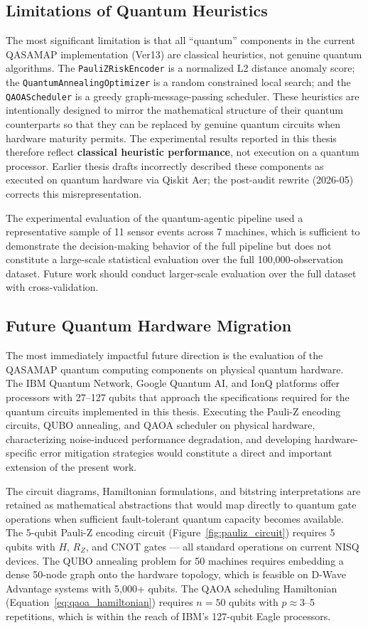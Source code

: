 \subsection{Limitations of Quantum Heuristics}

The most significant limitation is that all ``quantum'' components in the current QASAMAP implementation (Ver13) are classical heuristics, not genuine quantum algorithms. The \texttt{PauliZRiskEncoder} is a normalized L2 distance anomaly score; the \texttt{QuantumAnnealingOptimizer} is a random constrained local search; and the \texttt{QAOAScheduler} is a greedy graph-message-passing scheduler. These heuristics are intentionally designed to mirror the mathematical structure of their quantum counterparts so that they can be replaced by genuine quantum circuits when hardware maturity permits. The experimental results reported in this thesis therefore reflect \textbf{classical heuristic performance}, not execution on a quantum processor. Earlier thesis drafts incorrectly described these components as executed on quantum hardware via Qiskit Aer; the post-audit rewrite (2026-05) corrects this misrepresentation.

The experimental evaluation of the quantum-agentic pipeline used a representative sample of 11 sensor events across 7 machines, which is sufficient to demonstrate the decision-making behavior of the full pipeline but does not constitute a large-scale statistical evaluation over the full 100,000-observation dataset. Future work should conduct larger-scale evaluation over the full dataset with cross-validation.

\subsection{Future Quantum Hardware Migration}

The most immediately impactful future direction is the evaluation of the QASAMAP quantum computing components on physical quantum hardware. The IBM Quantum Network, Google Quantum AI, and IonQ platforms offer processors with 27--127 qubits that approach the specifications required for the quantum circuits implemented in this thesis. Executing the Pauli-Z encoding circuits, QUBO annealing, and QAOA scheduler on physical hardware, characterizing noise-induced performance degradation, and developing hardware-specific error mitigation strategies would constitute a direct and important extension of the present work.

The circuit diagrams, Hamiltonian formulations, and bitstring interpretations are retained as mathematical abstractions that would map directly to quantum gate operations when sufficient fault-tolerant quantum capacity becomes available. The 5-qubit Pauli-Z encoding circuit (Figure~\ref{fig:pauliz_circuit}) requires 5 qubits with $H$, $R_Z$, and CNOT gates --- all standard operations on current NISQ devices. The QUBO annealing problem for 50 machines requires embedding a dense 50-node graph onto the hardware topology, which is feasible on D-Wave Advantage systems with 5,000+ qubits. The QAOA scheduling Hamiltonian (Equation~\ref{eq:qaoa_hamiltonian}) requires $n = 50$ qubits with $p \approx 3$--5 repetitions, which is within the reach of IBM's 127-qubit Eagle processors.



